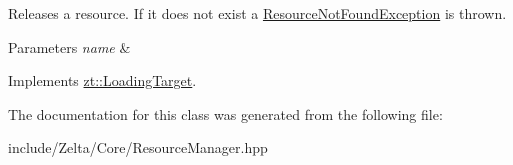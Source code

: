 Releases a resource. If it does not exist a \hyperlink{classzt_1_1_resource_not_found_exception}{Resource\+Not\+Found\+Exception} is thrown. 
\begin{DoxyParams}{Parameters}
{\em name} & \\
\hline
\end{DoxyParams}


Implements \hyperlink{classzt_1_1_loading_target}{zt\+::\+Loading\+Target}.



The documentation for this class was generated from the following file\+:\begin{DoxyCompactItemize}
\item 
include/\+Zelta/\+Core/Resource\+Manager.\+hpp\end{DoxyCompactItemize}
